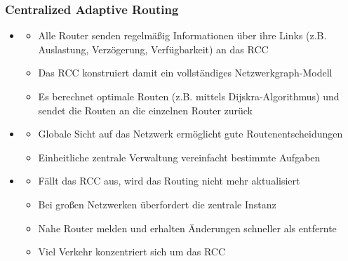 \subsubsection*{Centralized Adaptive Routing}
\begin{itemize}
    \item {}
    \begin{itemize}
        \item Alle Router senden regelmäßig Informationen über ihre Links (z.B. Auslastung, Verzögerung, Verfügbarkeit) an das RCC
        \item Das RCC konstruiert damit ein vollständiges Netzwerkgraph-Modell
        \item Es berechnet optimale Routen (z.B. mittels Dijskra-Algorithmus) und sendet die Routen an die einzelnen Router zurück
    \end{itemize}
    \item {}
    \begin{itemize}
        \item Globale Sicht auf das Netzwerk ermöglicht gute Routenentscheidungen
        \item Einheitliche zentrale Verwaltung vereinfacht bestimmte Aufgaben
    \end{itemize}
    \item {}
    \begin{itemize}
        \item {} Fällt das RCC aus, wird das Routing nicht mehr aktualisiert
        \item {} Bei großen Netzwerken überfordert die zentrale Instanz
        \item {} Nahe Router melden und erhalten Änderungen schneller als entfernte
        \item {} Viel Verkehr konzentriert sich um das RCC
    \end{itemize}
\end{itemize}
